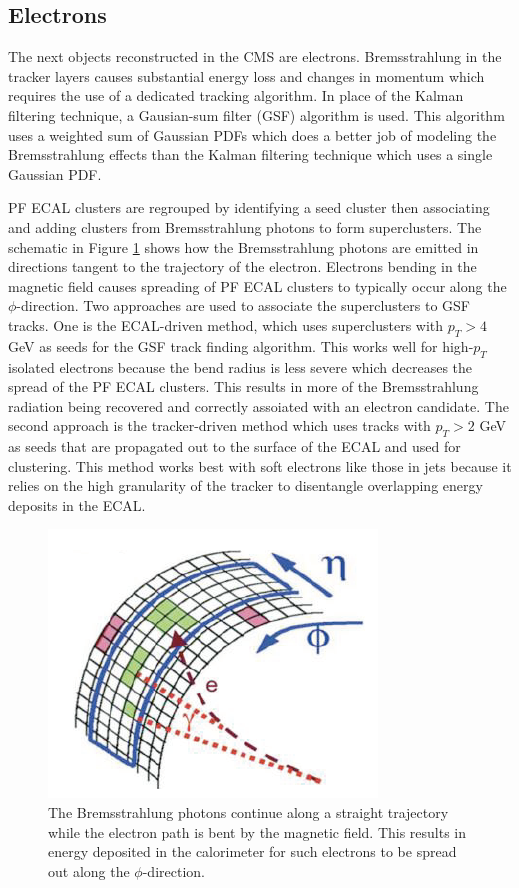 \subsection{Electrons}
The next objects reconstructed in the CMS are electrons.  Bremsstrahlung in the tracker layers causes substantial energy loss and changes in momentum which requires the use of a dedicated tracking algorithm.  In place of the Kalman filtering technique, a Gausian-sum filter (GSF) algorithm is used.  This algorithm uses a weighted sum of Gaussian PDFs which does a better job of modeling the Bremsstrahlung effects than the Kalman filtering technique which uses a single Gaussian PDF.  

PF ECAL clusters are regrouped by identifying a seed cluster then associating and adding clusters from Bremsstrahlung photons to form superclusters.  The schematic in Figure \ref{fig:electrontracking} shows how the Bremsstrahlung photons are emitted in directions tangent to the trajectory of the electron.  Electrons bending in the magnetic field causes spreading of PF ECAL clusters to typically occur along the $\phi$-direction.  Two approaches are used to associate the superclusters to GSF tracks.  One is the ECAL-driven method, which uses superclusters with $p_T > 4$ GeV as seeds for the GSF track finding algorithm.  This works well for high-$p_T$ isolated electrons because the bend radius is less severe which decreases the spread of the PF ECAL clusters. This results in more of the Bremsstrahlung radiation being recovered and correctly assoiated with an electron candidate.  The second approach is the tracker-driven method which uses tracks with $p_T > 2$ GeV as seeds that are propagated out to the surface of the ECAL and used for clustering.  This method works best with soft electrons like those in jets because it relies on the high granularity of the tracker to disentangle overlapping energy deposits in the ECAL. \cite{Electrontracking:2715343}

\begin{figure}[h]
	\centering
	\includegraphics[width=0.4\linewidth]{Figures/electrontracking}
	\caption{The Bremsstrahlung photons continue along a straight trajectory while the electron path is bent by the magnetic field.  This results in energy deposited in the calorimeter for such electrons to be spread out along the $\phi$-direction.}
	\label{fig:electrontracking}
\end{figure}

